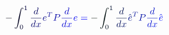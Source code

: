 \documentclass[12pt]{article}
\begin{document}
\makeatletter
\renewcommand*{\@textcolor}[3]{%
  \protect\leavevmode
  \begingroup
    \color#1{#2}#3%
  \endgroup
}
\makeatother
\begin{displaymath}
\mathcolor[RGB]{0,0,15}{-} \mathcolor[RGB]{0,0,30}{\int} _ { \mathcolor[RGB]{0,0,45}{0} } ^ { \mathcolor[RGB]{0,0,60}{1} } \mathcolor[RGB]{0,0,75}{\frac { \mathcolor[RGB]{0,0,90}{d} } { \mathcolor[RGB]{0,0,105}{d} \mathcolor[RGB]{0,0,120}{x} } } \mathcolor[RGB]{0,0,135}{e} ^ { \mathcolor[RGB]{0,0,150}{T} } \mathcolor[RGB]{0,0,165}{P} \mathcolor[RGB]{0,0,180}{\frac { \mathcolor[RGB]{0,0,195}{d} } { \mathcolor[RGB]{0,0,210}{d} \mathcolor[RGB]{0,0,225}{x} } } \mathcolor[RGB]{0,0,240}{e} \mathcolor[RGB]{0,0,255}{=} \mathcolor[RGB]{0,15,0}{-} \mathcolor[RGB]{0,15,15}{\int} _ { \mathcolor[RGB]{0,15,30}{0} } ^ { \mathcolor[RGB]{0,15,45}{1} } \mathcolor[RGB]{0,15,60}{\frac { \mathcolor[RGB]{0,15,75}{d} } { \mathcolor[RGB]{0,15,90}{d} \mathcolor[RGB]{0,15,105}{x} } } \mathcolor[RGB]{0,15,120}{\hat { \mathcolor[RGB]{0,15,135}{e} } } ^ { \mathcolor[RGB]{0,15,150}{T} } \mathcolor[RGB]{0,15,165}{P} \mathcolor[RGB]{0,15,180}{\frac { \mathcolor[RGB]{0,15,195}{d} } { \mathcolor[RGB]{0,15,210}{d} \mathcolor[RGB]{0,15,225}{x} } } \mathcolor[RGB]{0,15,240}{\hat { \mathcolor[RGB]{0,15,255}{e} } }
\end{displaymath}
\end{document}
